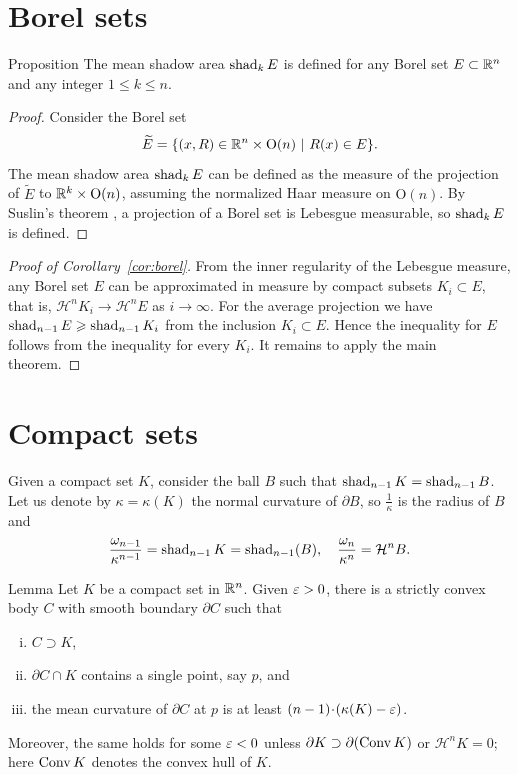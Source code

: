\documentclass[a4paper,10pt]{article}
\begin{document}
\section{Borel sets}\label{sec:borel}

\begin{thm}{Proposition}\label{prop:def}
The mean shadow area $\mathop{\rm shad}\nolimits_kE$ is defined for any Borel set $E\subset \mathbb{R}^n$ and any integer $1\le k\le n$.
\end{thm}

\begin{proof}
Consider the Borel set
\[
\widetilde E = \{(x,R)\in \mathbb{R}^n\times \mathrm{O}(n)\ |\ R(x)\in E\}.
\]
The mean shadow area $\mathop{\rm shad}\nolimits_kE$ can be defined as the measure of the projection of $\widetilde E$ to $\mathbb{R}^k\times \mathrm{O}(n)$, assuming the normalized Haar measure on $\mathrm{O}(n)$.
By Suslin's theorem \cite[Section~1.10]{bogachev-i}, a projection of a Borel set is Lebesgue measurable, so $\mathop{\rm shad}\nolimits_kE$ is defined.
\end{proof}

\begin{proof}[Proof of Corollary~\ref{cor:borel}]
From the inner regularity of the Lebesgue measure, any Borel set $E$ can be approximated in measure by compact subsets $K_i \subset E$, that is, $\mathcal H^n K_i \to \mathcal H^n E$ as $i \to \infty$.
For the average projection we have $\fav_{n-1}E \z\ge \fav_{n-1}K_i$ from the inclusion $K_i\subset E$.
Hence the inequality for $E$ follows from the inequality for every $K_i$.
It remains to apply the main theorem.
\end{proof}

\section{Compact sets}\label{sec:compact}

Given a compact set $K$, consider the ball $B$ such that $\mathop{\rm shad}\nolimits_{n-1}K=\mathop{\rm shad}\nolimits_{n-1}B$.
Let us denote by $\kappa=\kappa(K)$ the normal curvature of $\partial B$, so $\tfrac1\kappa$ is the radius of $B$ and
\[
\frac{\omega_{n-1}}{\kappa^{n-1}}=\mathop{\rm shad}\nolimits_{n-1}K=\mathop{\rm shad}\nolimits_{n-1}(B),\quad \frac{\omega_{n}}{\kappa^{n}}=\mathcal H^n B.
\]

\begin{thm}{Lemma}\label{lem:support}
Let $K$ be a compact set in $\mathbb{R}^n$.
Given $\varepsilon>0$, there is a strictly convex body $C$ with smooth boundary $\partial C$ such that
\begin{enumerate}[(i)]
 \item $C\supset K$,
 \item $\partial C\cap K$ contains a single point, say $p$, and
 \item the mean curvature of $\partial C$ at $p$ is at least $(n-1)\cdot (\kappa(K)\z-\eps)$.
\end{enumerate}
Moreover, the same holds for some $\varepsilon<0$ unless $\partial K\supset \partial(\mathop{\rm Conv} K)$ or $\mathcal H^n K=0$;
here $\mathop{\rm Conv} K$ denotes the convex hull of $K$.
\end{thm}
\end{document}
